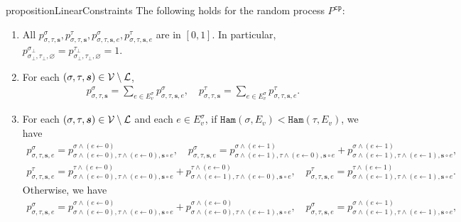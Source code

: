 \documentclass[11pt]{article}
\def\!#1{\mathtt{#1}}
\newcommand{\seqS}{\boldsymbol{s}}
\begin{document}
    \begin{restatable}{proposition}{LinearConstraints}\label{prop:coupling-linear-constraint}
    The following holds for the random process $P^{\!{cp}}$:
        \begin{enumerate}[(1)]
            \item All $p^{\sigma}_{\sigma, \tau, \seqS}, p^{\tau}_{\sigma, \tau, \seqS},p^{\sigma}_{\sigma, \tau, \seqS,e}, p^{\tau}_{\sigma, \tau, \seqS,e}$ are in $[0, 1]$. 
            In particular, $p^{\sigma_\bot}_{\sigma_\bot, \tau_\bot, \varnothing} = p^{\tau_\bot}_{\sigma_\bot, \tau_\bot, \varnothing} = 1$.
            \item For each $(\sigma, \tau, \seqS)\in \+V\setminus\+L$, 
            \begin{align}\label{eqn-inter-sum1}
               p^{\sigma}_{\sigma,\tau,\seqS} = \sum_{e \in E_v^{\sigma}} p^{\sigma}_{\sigma, \tau, \seqS, e}, \quad  p^{\tau}_{\sigma,\tau,\seqS}=\sum_{e \in  E_v^{\sigma}} p^{\tau}_{\sigma,\tau, \seqS, e}.
            \end{align}
            \item For each $(\sigma, \tau, \seqS)\in \+V\setminus\+L$ and each $e\in E_v^{\sigma}$, if {${\!{Ham}\left(\sigma, {E_v}\right)} < {\!{Ham}\left(\tau,{E_v}\right)}$}, we have 
            \begin{align}\label{eqn-inner-child-sum1}
                p^{\sigma}_{\sigma,\tau, \seqS,e} = p^{\sigma \land (e\gets 0)}_{\sigma \land (e\gets 0),\tau\land (e\gets 0), \seqS \circ e}, \quad  p^{\sigma}_{\sigma, \tau, \seqS, e}=p^{\sigma\land (e\gets 1)}_{\sigma\land (e\gets 1),\tau\land (e\gets 0), \seqS\circ e} + p^{\sigma\land (e\gets 1)}_{\sigma\land (e\gets 1),\tau\land (e\gets 1),\seqS \circ e},
            \end{align}
            \begin{align}\label{eqn-inner-child-sum2}
                p^{\tau}_{\sigma, \tau, \seqS, e} = p^{\tau \land (e \gets 0)}_{\sigma \land (e\gets 0),\tau\land (e\gets 0), \seqS \circ e} + p^{\tau\land (e\gets 0)}_{\sigma\land (e\gets 1),\tau\land (e\gets 0), \seqS \circ e}, \quad  p^{\tau}_{\sigma, \tau, \seqS, e}=p^{\tau \land (e\gets 1)}_{\sigma \land (e\gets 1), \tau\land (e \gets 1), \seqS\circ e}.
            \end{align}
            Otherwise, we have
            \begin{align}\label{eqn-inner-child-sum3}
                p^{\sigma}_{\sigma,\tau, \seqS,e}=p^{\sigma \land (e\gets 0)}_{\sigma\land (e\gets 0),\tau\land (e\gets 0), \seqS\circ e}+p^{\sigma\land (e\gets 0)}_{\sigma\land (e\gets 0),\tau\land (e\gets 1), \seqS \circ e}, \quad  p^{\sigma}_{\sigma,\tau, \seqS,e}=p^{\sigma\land (e\gets 1)}_{\sigma\land (e\gets 1),\tau\land (e\gets 1), \seqS\circ e},

\end{align}
\end{enumerate}
\end{restatable}
\end{document}
